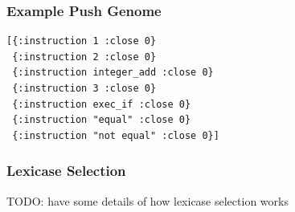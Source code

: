 \documentclass{beamer}
\begin{document}
\begin{frame}[fragile]
  \frametitle{Example Push Genome}
\begin{verbatim}
[{:instruction 1 :close 0}
 {:instruction 2 :close 0}
 {:instruction integer_add :close 0}
 {:instruction 3 :close 0}
 {:instruction exec_if :close 0}
 {:instruction "equal" :close 0}
 {:instruction "not equal" :close 0}]
\end{verbatim}
\end{frame}

\begin{frame}
  \frametitle{Lexicase Selection}
 TODO: have some details of how lexicase selection works
\end{frame}
\end{document}
